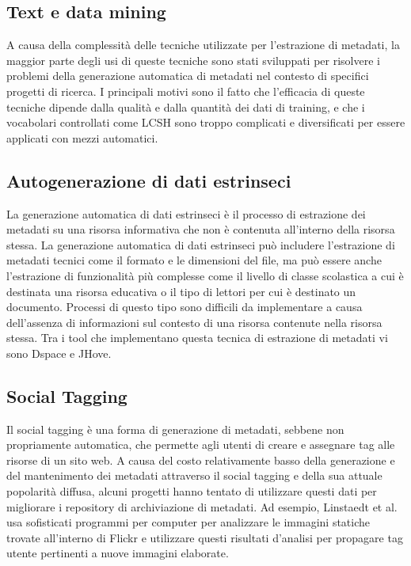 \subsection{Text e data mining}
A causa della complessità delle tecniche utilizzate per l'estrazione di metadati, la maggior parte degli usi di queste tecniche sono stati sviluppati per risolvere i problemi della generazione automatica di metadati nel contesto di specifici progetti di ricerca.
I principali motivi sono il fatto che l'efficacia di queste tecniche dipende dalla qualità e dalla quantità dei dati di training, e che i vocabolari controllati come LCSH sono troppo complicati e diversificati per essere applicati con mezzi automatici.

\subsection{Autogenerazione di dati estrinseci}
La generazione automatica di dati estrinseci è il processo di estrazione dei metadati su una risorsa informativa che non è contenuta all'interno della risorsa stessa. La generazione automatica di dati estrinseci può includere l'estrazione di metadati tecnici come il formato e le dimensioni del file, ma può essere anche l'estrazione di funzionalità più complesse come il livello di classe scolastica a cui è destinata una risorsa educativa o il tipo di lettori per cui è destinato un documento.
Processi di questo tipo sono difficili da implementare a causa dell'assenza di informazioni sul contesto di una risorsa
contenute nella risorsa stessa.
Tra i tool che implementano questa tecnica di estrazione di metadati vi sono Dspace e JHove.

\subsection{Social Tagging}
Il social tagging è una forma di generazione di metadati, sebbene non propriamente automatica, che permette agli utenti di creare e assegnare tag alle risorse di un sito web. A causa del costo relativamente basso della generazione e del mantenimento dei metadati attraverso il social tagging e della sua attuale popolarità diffusa, alcuni progetti hanno tentato di utilizzare questi dati per migliorare i repository di archiviazione di metadati. Ad esempio, Linstaedt et al. usa sofisticati programmi per computer per analizzare le immagini statiche trovate all'interno di Flickr e utilizzare questi risultati d'analisi per propagare tag utente pertinenti a nuove immagini elaborate.

